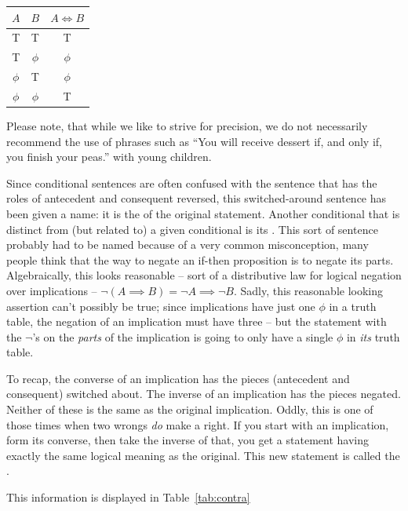 \begin{center}
\begin{tabular}{c|c||c}
\; $A$ \; & \; $B$ \; & \; $A \iff B$ \; \\ \hline
T & T & T \\
T & $\phi$ & $\phi$\\
 $\phi$ & T & $\phi$ \\
 $\phi$ &  $\phi$ & T\\
\end{tabular}
\end{center}

Please note, that while we like to strive for precision, we do not
necessarily recommend the use of phrases such as 
``You will receive dessert if, and only if,
you finish your peas.'' with young children.


Since conditional sentences are often confused with the sentence
that has the roles of antecedent and consequent reversed, this
switched-around sentence has been given a name: it is the 
of the original statement.  Another conditional that is distinct from 
(but related to) a given conditional is its .  
This sort of sentence probably had to be named because of a very common 
misconception, many people think that the way to negate an if-then 
proposition is to negate
its parts.  Algebraically, this looks reasonable -- sort of a distributive
law for logical negation over implications -- $\lnot( A \implies B) =
{\lnot}A \implies {\lnot}B$.  Sadly, this reasonable looking assertion
can't possibly be true; since implications have just one $\phi$ in a truth 
table, the negation of an implication  must have three -- but the statement 
with the $\lnot$'s on the {\em parts} of the implication is going to only have 
a single $\phi$ in {\em its} truth table.

To recap, the converse of an implication has the pieces (antecedent and 
consequent) switched about.  The inverse of an implication has the 
pieces negated.  Neither of these is the same as the original implication.
Oddly, this is one of those times when two wrongs {\em do} make a right.
If you start with an implication, form its converse, then take the inverse
of that, you get a statement having exactly the same logical meaning
as the original.  This new statement is called the 
.

This information is displayed in Table~\ref{tab:contra} 

